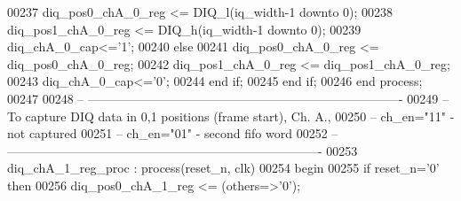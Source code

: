\begin{DoxyCode}
00237             \textcolor{vhdlchar}{diq_pos0_chA_0_reg} \textcolor{vhdlchar}{<=} \textcolor{vhdlchar}{DIQ_l}\textcolor{vhdlchar}{(}\textcolor{vhdlchar}{iq_width}\textcolor{vhdlchar}{-}\textcolor{vhdllogic}{}\textcolor{vhdllogic}{1} \textcolor{keywordflow}{downto} \textcolor{vhdllogic}{}\textcolor{vhdllogic}{0}\textcolor{vhdlchar}{)};
00238             \textcolor{vhdlchar}{diq_pos1_chA_0_reg} \textcolor{vhdlchar}{<=} \textcolor{vhdlchar}{DIQ_h}\textcolor{vhdlchar}{(}\textcolor{vhdlchar}{iq_width}\textcolor{vhdlchar}{-}\textcolor{vhdllogic}{}\textcolor{vhdllogic}{1} \textcolor{keywordflow}{downto} \textcolor{vhdllogic}{}\textcolor{vhdllogic}{0}\textcolor{vhdlchar}{)};
00239             \textcolor{vhdlchar}{diq_chA_0_cap}\textcolor{vhdlchar}{<=}\textcolor{vhdlchar}{'}\textcolor{vhdllogic}{}\textcolor{vhdllogic}{1}\textcolor{vhdlchar}{'};
00240             \textcolor{keywordflow}{else} 
00241                 \textcolor{vhdlchar}{diq_pos0_chA_0_reg} \textcolor{vhdlchar}{<=} \textcolor{vhdlchar}{diq_pos0_chA_0_reg};
00242                 \textcolor{vhdlchar}{diq_pos1_chA_0_reg} \textcolor{vhdlchar}{<=} \textcolor{vhdlchar}{diq_pos1_chA_0_reg};
00243             \textcolor{vhdlchar}{diq_chA_0_cap}\textcolor{vhdlchar}{<=}\textcolor{vhdlchar}{'}\textcolor{vhdllogic}{}\textcolor{vhdllogic}{0}\textcolor{vhdlchar}{'};
00244             \textcolor{keywordflow}{end} \textcolor{keywordflow}{if}; 
00245         \textcolor{keywordflow}{end} \textcolor{keywordflow}{if};
00246     \textcolor{keywordflow}{end} \textcolor{keywordflow}{process};
00247 
00248 \textcolor{keyword}{-- ----------------------------------------------------------------------------}
00249 \textcolor{keyword}{-- To capture DIQ data in 0,1 positions (frame start), Ch. A., }
00250 \textcolor{keyword}{-- ch\_en="11" - not captured}
00251 \textcolor{keyword}{-- ch\_en="01" - second fifo word}
00252 \textcolor{keyword}{-- ----------------------------------------------------------------------------}
00253  diq\_chA\_1\_reg\_proc : \textcolor{keywordflow}{process}(reset_n, clk)
00254 \textcolor{vhdlkeyword}{    begin}
00255       \textcolor{keywordflow}{if} \textcolor{vhdlchar}{reset_n}\textcolor{vhdlchar}{=}\textcolor{vhdlchar}{'}\textcolor{vhdllogic}{}\textcolor{vhdllogic}{0}\textcolor{vhdlchar}{'} \textcolor{keywordflow}{then}
00256          \textcolor{vhdlchar}{diq_pos0_chA_1_reg} \textcolor{vhdlchar}{<=} \textcolor{vhdlchar}{(}\textcolor{keywordflow}{others}\textcolor{vhdlchar}{=}\textcolor{vhdlchar}{>}\textcolor{vhdlchar}{'}\textcolor{vhdllogic}{}\textcolor{vhdllogic}{0}\textcolor{vhdlchar}{'}\textcolor{vhdlchar}{)};

\end{DoxyCode}

